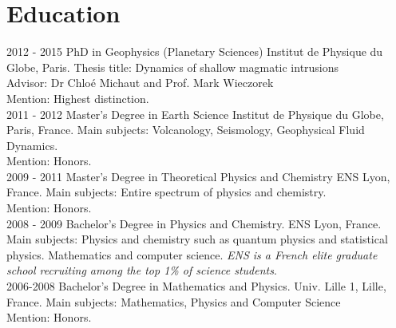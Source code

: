 \documentclass[]{friggeri-cv}
\begin{document}
\section{Education}
\begin{entrylist}
  \entry
  {2012 - 2015}
  {PhD in Geophysics (Planetary Sciences)}
  {Institut de Physique du Globe, Paris.}
  {Thesis title: Dynamics of shallow magmatic intrusions\\
    Advisor: Dr Chloé Michaut and Prof. Mark Wieczorek\\
    Mention: Highest distinction.\\}
  \entry
  {2011 - 2012}
  {Master's Degree in Earth Science}
  {Institut de Physique du Globe, Paris, France.}
  {Main subjects: Volcanology, Seismology, Geophysical Fluid Dynamics.\\
    Mention: Honors. \\}
  \entry
  {2009 - 2011}
  {Master's Degree in Theoretical Physics and Chemistry}
  {ENS Lyon, France.}
  {Main subjects: Entire spectrum of physics and chemistry.\\
    Mention: Honors.\\}
  \entry
  {2008 - 2009}
  {Bachelor's Degree in Physics and Chemistry.}
  {ENS Lyon, France.}
  {Main subjects: Physics and chemistry such as quantum physics and statistical physics.  Mathematics and computer science. \emph{ENS is a French elite graduate school recruiting among the top 1\% of science students}.\\}
  \entry
  {2006-2008}
  {Bachelor's Degree in Mathematics and Physics.}
  {Univ. Lille 1, Lille, France.}
  {Main subjects: Mathematics, Physics and Computer Science\\
    Mention: Honors.}
\end{entrylist}

\newpage
\end{document}
